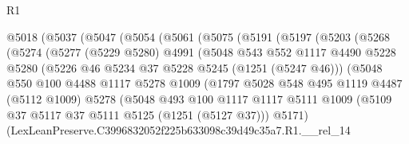 \begin{lexlean}{R1}
\begin{coremodule}
                @5018
                  (@5037
                    (@5047
                      (@5054
                        (@5061
                          (@5075
                            (@5191
                              (@5197
                                (@5203
                                  (@5268
                                    (@5274
                                      (@5277
                                        (@5229 @5280)
                                        @4991
                                        (@5048
                                          @543
                                          @552
                                          @1117
                                          @4490
                                          @5228
                                          @5280
                                          (@5226 @46 @5234 @37 @5228 @5245 (@1251 (@5247 @46)))
                                          (@5048
                                            @550
                                            @100
                                            @4488
                                            @1117
                                            @5278
                                            @1009
                                            (@1797
                                              @5028
                                              @548
                                              @495
                                              @1119
                                              @4487
                                              (@5112 @1009)
                                              @5278
                                              (@5048
                                                @493
                                                @100
                                                @1117
                                                @1117
                                                @5111
                                                @1009
                                                (@5109
                                                  @37
                                                  @5117
                                                  @37
                                                  @5111
                                                  @5125
                                                  (@1251 (@5127 @37)))
                                                @5171)
                                              (LexLeanPreserve.C3996832052f225b633098c39d49c35a7.R1.__rel_14

\end{coremodule}
\end{lexlean}
